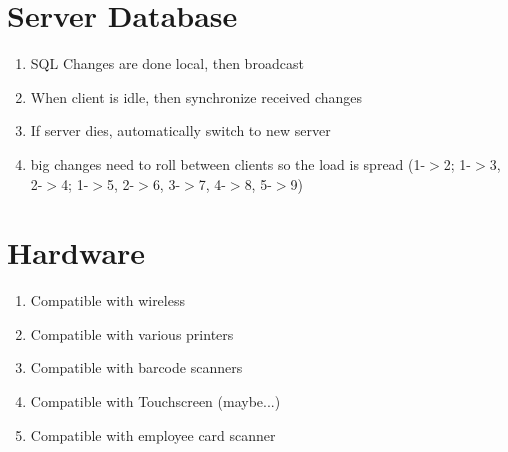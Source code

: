 \section{Server Database}
\begin{enumerate}
	\item SQL Changes are done local, then broadcast
	\item When client is idle, then synchronize received changes
	\item If server dies, automatically switch to new server
	\item big changes need to roll between clients so the load is spread (1-$>$2; 1-$>$3, 2-$>$4; 1-$>$5, 2-$>$6, 3-$>$7, 4-$>$8, 5-$>$9)
\end{enumerate}

\section{Hardware}
\begin{enumerate}
	\item Compatible with wireless
	\item Compatible with various printers
	\item Compatible with barcode scanners
	\item Compatible with Touchscreen (maybe...)
	\item Compatible with employee card scanner
\end{enumerate}